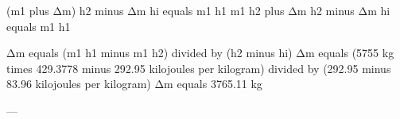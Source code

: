 (m1 plus Δm) h2 minus Δm hi equals m1 h1  
m1 h2 plus Δm h2 minus Δm hi equals m1 h1  

Δm equals (m1 h1 minus m1 h2) divided by (h2 minus hi)  
Δm equals (5755 kg times 429.3778 minus 292.95 kilojoules per kilogram) divided by (292.95 minus 83.96 kilojoules per kilogram)  
Δm equals 3765.11 kg  

---